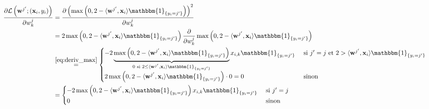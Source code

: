 \documentclass[11pt, french, english]{article}
\def\wkj{w_{k}^{j}}
\begin{document}
\begin{enumerate}
\begin{reponse}
		      \begin{align}
			      \label{eq:derivL}
			      \begin{split}
				      \frac{\partial\mathcal{L}\left(\mathbf{w}^{j^{\prime}}; (\mathbf{x}_i, y_i)\right)}{\partial\wkj}
				      &= \frac{\partial\left(\max\left(0, 2 - \langle \mathbf{w}^{j^{\prime}}, \mathbf{x}_i \rangle\mathbbm{1}_{\{y_i = j^{\prime}\}}\right)\right)^2}{\partial\wkj}\\
				      &= 2\max\left(0, 2 - \langle \mathbf{w}^{j^{\prime}}, \mathbf{x}_i \rangle\mathbbm{1}_{\{y_i = j^{\prime}\}}\right)\frac{\partial}{\partial\wkj}\max\left(0, 2 - \langle \mathbf{w}^{j^{\prime}}, \mathbf{x}_i \rangle\mathbbm{1}_{\{y_i = j^{\prime}\}}\right)\\
				      &\overset{\ref{eq:deriv_max}}{=} \begin{cases}
					      -2\underbrace{\max\left(0, 2 - \langle \mathbf{w}^{j^{\prime}}, \mathbf{x}_i \rangle\mathbbm{1}_{\{y_i = j^{\prime}\}}\right)}_{0 \text{ si } 2 \leq \langle \mathbf{w}^{j^{\prime}}, \mathbf{x}_i \rangle\mathbbm{1}_{\{y_i = j^{\prime}\}}}x_{i,k}\mathbbm{1}_{\{y_i = j^{\prime}\}} & \text{ si } j^{\prime} = j \text{ et } 2 >\langle \mathbf{w}^{j^{\prime}}, \mathbf{x}_i \rangle\mathbbm{1}_{\{y_i = j^{\prime}\}} \\
					      2\max\left(0, 2 - \langle \mathbf{w}^{j^{\prime}}, \mathbf{x}_i \rangle\mathbbm{1}_{\{y_i = j^{\prime}\}}\right) \cdot 0 = 0                                                                                                                                                           & \text{ sinon }
				      \end{cases}\\
				      &= \begin{cases}
					      -2\max\left(0, 2 - \langle \mathbf{w}^{j^{\prime}}, \mathbf{x}_i \rangle\mathbbm{1}_{\{y_i = j^{\prime}\}}\right)x_{i,k}\mathbbm{1}_{\{y_i = j^{\prime}\}} & \text{ si } j^{\prime} = j \\
					      0                                                                                                                                                          & \text{ sinon }
				      \end{cases}
			      \end{split}
		      \end{align}


\end{reponse}
\end{enumerate}
\end{document}
